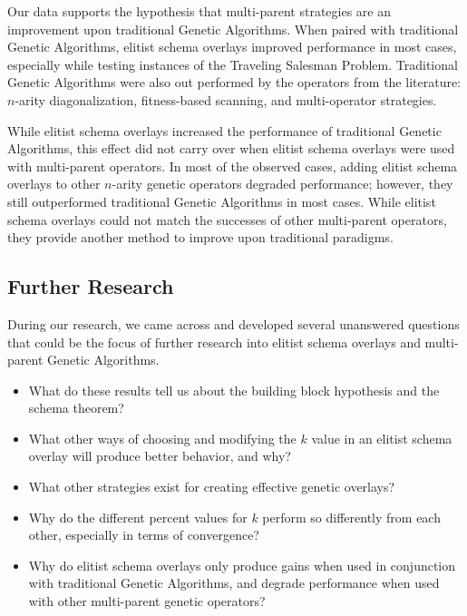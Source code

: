 Our data supports the hypothesis that multi-parent strategies are an improvement upon traditional Genetic Algorithms. When paired with traditional Genetic Algorithms, elitist schema overlays improved performance in most cases, especially while testing instances of the Traveling Salesman Problem. Traditional Genetic Algorithms were also out performed by the operators from the literature: $n$-arity diagonalization, fitness-based scanning, and multi-operator strategies. 

While elitist schema overlays increased the performance of traditional Genetic Algorithms, this effect did not carry over when elitist schema overlays were used with multi-parent operators. In most of the observed cases, adding elitist schema overlays to other $n$-arity genetic operators degraded performance; however, they still outperformed traditional Genetic Algorithms in most cases. While elitist schema overlays could not match the successes of other multi-parent operators, they provide another method to improve upon traditional paradigms.

\subsection*{Further Research}
During our research, we came across and developed several unanswered questions that could be the focus of further research into elitist schema overlays and multi-parent Genetic Algorithms. 

\begin{itemize}
\item What do these results tell us about the building block hypothesis and the schema theorem?

\item What other ways of choosing and modifying the $k$ value in an elitist schema overlay will produce better behavior, and why?

\item What other strategies exist for creating effective genetic overlays?

\item Why do the different percent values for $k$ perform so differently from each other, especially in terms of convergence?

\item Why do elitist schema overlays only produce gains when used in conjunction with traditional Genetic Algorithms, and degrade performance when used with other multi-parent genetic operators?
\end{itemize}